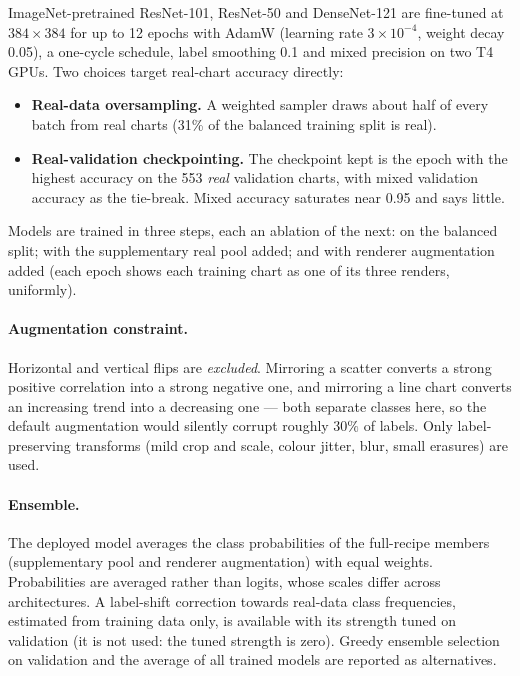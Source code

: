 ImageNet-pretrained ResNet-101, ResNet-50 and DenseNet-121 are fine-tuned at
$384\times384$ for up to 12 epochs with AdamW (learning rate $3\times10^{-4}$,
weight decay 0.05), a one-cycle schedule, label smoothing 0.1 and mixed precision on
two T4 GPUs. Two choices target real-chart accuracy directly:
\begin{itemize}[leftmargin=1.3em]
  \item \textbf{Real-data oversampling.} A weighted sampler draws about half of every
  batch from real charts (31\% of the balanced training split is real).
  \item \textbf{Real-validation checkpointing.} The checkpoint kept is the epoch with
  the highest accuracy on the 553 \emph{real} validation charts, with mixed validation
  accuracy as the tie-break. Mixed accuracy saturates near 0.95 and says little.
\end{itemize}
Models are trained in three steps, each an ablation of the next: on the balanced split;
with the supplementary real pool added; and with renderer augmentation added (each
epoch shows each training chart as one of its three renders, uniformly).

\paragraph{Augmentation constraint.} Horizontal and vertical flips are
\emph{excluded}. Mirroring a scatter converts a strong positive correlation into
a strong negative one, and mirroring a line chart converts an increasing trend
into a decreasing one --- both separate classes here, so the default augmentation
would silently corrupt roughly $30\%$ of labels. Only label-preserving transforms
(mild crop and scale, colour jitter, blur, small erasures) are used.

\paragraph{Ensemble.} The deployed model averages the class probabilities of the
full-recipe members (supplementary pool and renderer augmentation) with equal weights.
Probabilities are averaged rather than logits, whose scales differ across
architectures. A label-shift correction towards real-data class frequencies, estimated
from training data only, is available with its strength tuned on validation (it is
not used: the tuned strength is zero). Greedy ensemble selection on validation and the
average of all trained models are reported as alternatives.

